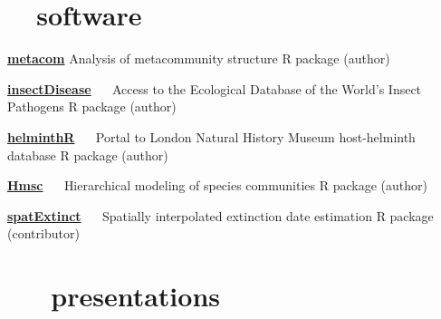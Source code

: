 \documentclass[]{CV}
\begin{document}
\section{\faCode \ \  software}
\begin{entrylist}
 \entry
 {\href{http://cran.r-project.org/web/packages/metacom/}{\textbf{metacom}}}
 {Analysis of metacommunity structure} 
 {R package (author)}

 \entry
 {\href{https://github.com/viralemergence/insectDisease}{\textbf{insectDisease}} \ \ }
 {Access to the Ecological Database of the World's Insect Pathogens}
 {R package (author)}

 \entry
 {\href{https://cran.r-project.org/web/packages/helminthR/index.html}{\textbf{helminthR}} \ \ }
 {Portal to London Natural History Museum host-helminth database}
 {R package (author)}

 \entry
 {\href{https://cran.r-project.org/web/packages/Hmsc/index.html}{\textbf{Hmsc}} \ \ }
 {Hierarchical modeling of species communities}
 {R package (author)}

 \entry
 {\href{http://github.com/cjcarlson/spatExtinct}{\textbf{spatExtinct}} \ \ }
 {Spatially interpolated extinction date estimation}
 {R package (contributor)}

\end{entrylist}





\section{\faVideoCamera \ \ \ presentations}
\end{document}
